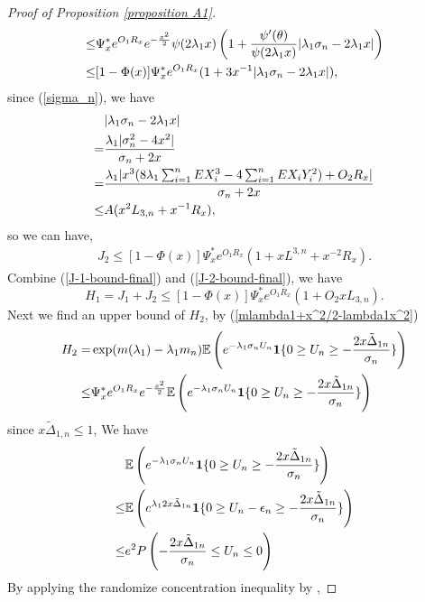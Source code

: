 \documentclass[bj,authoryear]{imsart}
\numberwithin{equation}{section}
\theoremstyle{plain}
\theoremstyle{definition}
\begin{document}
\begin{proof}[Proof of Proposition \ref{proposition A1}]
\begin{align}
  \leq & \Psi^{*}_{x}e^{O_{1}R_x}e^{-\frac{x^2}{2}}\psi(2\lambda_{1}x)\left(1+\frac{\psi^{\prime}(\theta)}{\psi(2\lambda_{1}x)}|\lambda_{1}\sigma_{n}-2\lambda_{1}x|\right)\notag\\
  \leq &[1-\Phi(x)]\Psi^{*}_{x}e^{O_{1}R_x}(1+3x^{-1}|\lambda_{1}\sigma_{n}-2\lambda_{1}x|),\label{J-2-bound-middle}
\end{align}
since (\ref{sigma_n}), we have
\begin{align}
  &|\lambda_{1}\sigma_{n}-2\lambda_{1}x|\notag\\
  = & \frac{\lambda_{1}|\sigma_n^2-4x^2|}{\sigma_n+2x}\notag\\
  = & \frac{\lambda_{1}|x^3(8\lambda_{1}\sum_{i=1}^{n}EX_i^3-4\sum_{i=1}^{n}EX_iY_i^2)+O_2R_x|}{\sigma_n+2x}\notag\\
  \leq & A(x^2L_{3,n}+x^{-1}R_x),
\end{align}
so we can have,
\begin{align}
  J_2 \leq [1-\Phi(x)]\Psi^{*}_{x}e^{O_{1}R_x}(1+xL^{3,n}+x^{-2}R_{x}).\label{J-2-bound-final}
\end{align}
Combine (\ref{J-1-bound-final}) and (\ref{J-2-bound-final}), we have
\begin{equation}
  H_1 = J_1+J_2 \leq [1-\Phi(x)]\Psi^{*}_{x}e^{O_{1}R_x}(1+O_{2}xL_{3,n}).\label{H-1-bound-final}
\end{equation}
Next we find an upper bound of $H_2$, by (\ref{mlambda1+x^2/2-lambda1x^2})
\begin{align}
  H_2 = & \exp(m(\lambda_1)-\lambda_1m_n)\mathbb{E} \left(e^{-\lambda_1\sigma_n U_n}{\bf 1}\{0\geq U_n\geq -\frac{2x\tilde{\Delta}_{1n}}{\sigma_n}\}\right)\notag\\
  \leq &\Psi^{*}_{x}e^{O_{1}R_x}e^{-\frac{x^2}{2}}\mathbb{E} \left(e^{-\lambda_{1}\sigma_{n}U_n}{\bf 1}\{0\geq U_n\geq -\frac{2x\tilde{\Delta}_{1n}}{\sigma_n}\}\right)
\end{align}
since $x\tilde{\Delta}_{1,n}\leq 1$, We have
\begin{align}
  &\mathbb{E} \left(e^{-\lambda_{1}\sigma_{n}U_n}{\bf 1}\{0\geq U_n \geq -\frac{2x\tilde{\Delta}_{1n}}{\sigma_n}\}\right)\notag\\
  \leq &\mathbb{E}\left(e^{\lambda_{1}2x\tilde{\Delta}_{1n}}{\bf 1}\{0\geq U_n-\epsilon_n\geq-\frac{2x\tilde{\Delta}_{1n}}{\sigma_n}\}\right)\notag\\
  \leq&e^{2}P\left(-\frac{2x\tilde{\Delta}_{1n}}{\sigma_n}\leq U_n\leq 0\right)
\end{align}
By applying the randomize concentration inequality by \cite{shao2016cramer},

\end{proof}
\end{document}
